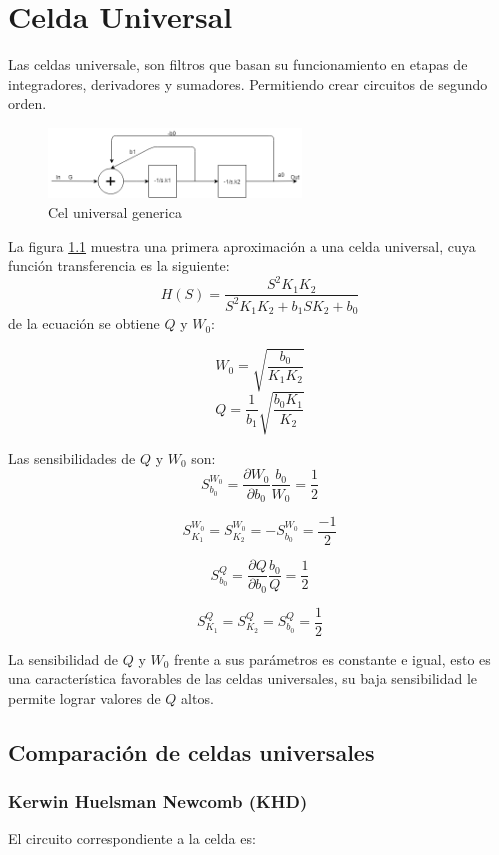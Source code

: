 \documentclass[../../tc_tp5_main.tex]{subfiles}
\begin{document}
\chapter{Celda Universal}

Las celdas universale, son filtros que basan su funcionamiento en etapas de integradores, derivadores y sumadores. Permitiendo crear circuitos de segundo orden.

\begin{figure}[H]	
	\centering
	\includegraphics[width=0.6\textwidth]{imagenes/uniGen.png}
	\caption{Cel universal generica}\label{fig:unigen}
\end{figure}

La figura \ref{fig:unigen} muestra una primera aproximación a una celda universal, cuya función transferencia es la siguiente:
$$ H(S)=\frac{S^2 K_1 K_2 }{S^2 K_1 K_2 + b_1 S K_2 + b_0 }$$
de la ecuación se obtiene $Q$ y $W_0$:

$$W_0=\sqrt{\frac{b_0}{K_1 K_2}}$$
$$Q=\frac{1}{b_1}\sqrt{\frac{b_0 K_1}{K_2}}$$

Las sensibilidades de $Q$ y $W_0$ son:
$$ S^{W_0}_{b_0}=\frac{ \partial W_0}{\partial b_0} \frac{b_0}{W_0}= \frac {1}{2}$$

$$ S^{W_0}_{K_1}= S^{W_0}_{K_2}= - S^{W_0}_{b_0}= \frac {-1}{2}$$

$$ S^{Q}_{b_0}=\frac{ \partial Q}{\partial b_0} \frac{b_0}{Q}= \frac {1}{2}$$

$$ S^{Q}_{K_1}= S^{Q}_{K_2}= S^{Q}_{b_0}= \frac {1}{2}$$

La sensibilidad de $Q$ y $W_0$ frente a sus parámetros es constante e igual, esto es una característica favorables de las celdas universales, su baja sensibilidad le permite lograr valores de $Q$ altos.

\section{Comparación de celdas universales}

\subsection{Kerwin Huelsman Newcomb (KHD)}
El circuito correspondiente a la celda es:
\end{document}

